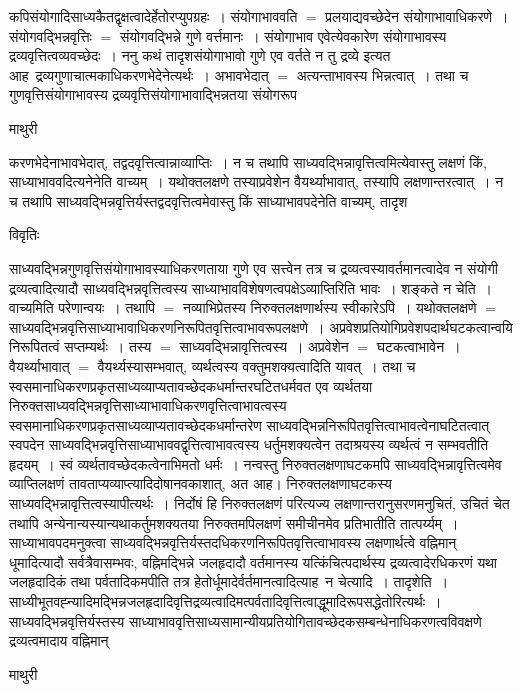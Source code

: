 \documentclass[10pt, openany]{book}
\begin{document}
{कपिसंयोगादिसाध्यकैतद्वृक्षत्वादेर्हेतोरप्युपग्रहः~। संयोगाभाववति $=$ प्रलयाद्यवच्छेदेन संयोगाभावाधिकरणे~। संयोगवद्भिन्नवृत्तिः $=$ संयोगवद्भिन्ने गुणे वर्त्तमानः~।
संयोगाभाव एवेत्येवकारेण संयोगाभावस्य द्रव्यवृत्तित्वव्यवच्छेदः~। ननु कथं तादृशसंयोगाभावो गुणे एव वर्तते न तु द्रव्ये इत्यत आह~द्रव्यगुणाचात्मकाधिकरणभेदेनेत्यर्थः~। अभावभेदात् $=$ अत्यन्ताभावस्य भिन्नत्वात्~। तथा च गुणवृत्तिसंयोगाभावस्य द्रव्यवृत्तिसंयोगाभावाद्भिन्नतया संयोगरूप
\newpage
\begin{center}  माथुरी  \end{center} 
{\la करणभेदेनाभावभेदात्, तद्वदवृत्तित्वान्नाव्याप्तिः~। न च तथापि  साध्यवद्भिन्नावृत्तित्वमित्येवास्तु लक्षणं किं, साध्याभाववदित्यनेनेति वाच्यम्~। यथोक्तलक्षणे तस्याप्रवेशेन वैयर्थ्याभावात्,  तस्यापि लक्षणान्तरत्वात्~। न च तथापि साध्यवद्भिन्नवृत्तिर्यस्तद्वदवृत्तित्वमेवास्तु किं साध्याभावपदेनेति वाच्यम्, तादृश}
\begin{center}     विवृतिः \end{center}
साध्यवद्भिन्नगुणवृत्तिसंयोगाभावस्याधिकरणताया गुणे एव सत्त्वेन तत्र च द्रव्यत्वस्यावर्तमानत्वादेव न संयोगी द्रव्यत्वादित्यादौ साध्यवद्भिन्नवृत्तित्वस्य साध्याभावविशेषणत्वपक्षेऽव्याप्तिरिति भावः~। शङ्कते {\la न चेति~।} वाच्यमिति परेणान्वयः~। तथापि $=$ नव्याभिप्रेतस्य निरुक्तलक्षणार्थस्य स्वीकारेऽपि~।
यथोक्तलक्षणे $=$  साध्यवद्भिन्नवृत्तिसाध्याभावाधिकरणनिरूपितवृत्तित्वाभावरूपलक्षणे~। अप्रवेशप्रतियोगिप्रवेशपदार्थघटकत्वान्वयि निरूपितत्वं सप्तम्यर्थः~। तस्य $=$ 
साध्यवद्भिन्नावृत्तित्वस्य~। अप्रवेशेन $=$ घटकत्वाभावेन~। वैयर्थ्याभावात् $=$ वैयर्थ्यस्यासम्भवात्, व्यर्थत्वस्य वक्तुमशक्यत्वादिति यावत्~। तथा च
स्वसमानाधिकरणप्रकृतसाध्यव्याप्यतावच्छेदकधर्मान्तरघटितधर्मवत एव व्यर्थतया निरुक्तसाध्यवद्भिन्नवृत्तिसाध्याभावाधिकरणवृत्तित्वाभावत्वस्य
स्वसमानाधिकरणप्रकृतसाध्यव्याप्यतावच्छेदकधर्मान्तरेण साध्यवद्भिन्ननिरूपितवृत्तित्वाभावत्वेनाघटितत्वात् स्वपदेन साध्यवद्भिन्नवृत्तिसाध्याभाववद्वृत्तित्वाभावत्वस्य
धर्तुमशक्यत्वेन तदाश्रयस्य व्यर्थत्वं न सम्भवतीति हृदयम्~। स्वं व्यर्थतावच्छेदकत्वेनाभिमतो धर्मः~। नन्वस्तु निरुक्तलक्षणाघटकमपि साध्यवद्भिन्नावृत्तित्वमेव
व्याप्तिलक्षणं तावताप्यव्याप्त्यादिदोषानवकाशात्, अत आह। निरुक्तलक्षणाघटकस्य साध्यवद्भिन्नावृत्तित्वस्यापीत्यर्थः~। निर्दोषं हि निरुक्तलक्षणं परित्यज्य लक्षणान्तरानुसरणमनुचितं,  उचितं चेत तथापि अन्येनान्यस्यान्यथाकर्तुमशक्यतया निरुक्तमपिलक्षणं समीचीनमेव प्रतिभातीति तात्पर्य्यम्~। साध्याभावपदमनुक्त्वा
साध्यवद्भिन्नवृत्तिर्यस्तदधिकरणनिरूपितवृत्तित्वाभावस्य लक्षणार्थत्वे वह्निमान् धूमादित्यादौ सर्वत्रैवासम्भवः, वह्निमद्भिन्ने जलहृदादौ वर्तमानस्य यत्किंचित्पदार्थस्य द्रव्यत्वादेरधिकरणं यथा जलहृदादिकं तथा पर्वतादिकमपीति तत्र हेतोर्धूमादेर्वर्तमानत्वादित्याह\textendash\ {\la न चेत्यादि~। तादृशेति~।}
साध्यीभूतवह्न्यादिमद्भिन्नजलहृदादिवृत्तिद्रव्यत्वादिमत्पर्वतादिवृत्तित्वाद्धूमादिरूपसद्धेतोरित्यर्थः~। साध्यवद्भिन्नवृत्तिर्यस्तस्य साध्याभाववृत्तिसाध्यसामान्यीयप्रतियोगितावच्छेदकसम्बन्धेनाधिकरणत्वविवक्षणे द्रव्यत्वमादाय वह्निमान्
\newpage
\begin{center}  माथुरी  \end{center} 

}
\end{document}
